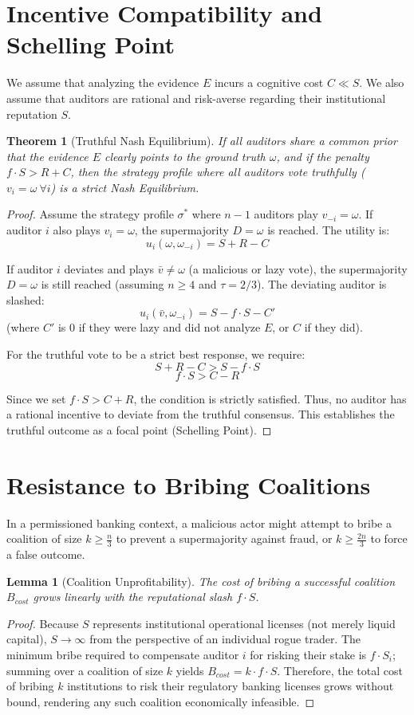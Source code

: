 \documentclass[11pt,a4paper]{article}
\newtheorem{theorem}{Theorem}
\newtheorem{lemma}{Lemma}
\begin{document}
\section{Incentive Compatibility and Schelling Point}
We assume that analyzing the evidence $E$ incurs a cognitive cost $C \ll S$. We also assume that auditors are rational and risk-averse regarding their institutional reputation $S$.

\begin{theorem}[Truthful Nash Equilibrium]
If all auditors share a common prior that the evidence $E$ clearly points to the ground truth $\omega$, and if the penalty $f \cdot S > R + C$, then the strategy profile where all auditors vote truthfully ($v_i = \omega \ \forall i$) is a strict Nash Equilibrium.
\end{theorem}
\begin{proof}
Assume the strategy profile $\sigma^*$ where $n-1$ auditors play $v_{-i} = \omega$.
If auditor $i$ also plays $v_i = \omega$, the supermajority $D = \omega$ is reached.
The utility is:
\[ u_i(\omega, \omega_{-i}) = S + R - C \]

If auditor $i$ deviates and plays $\bar{v} \neq \omega$ (a malicious or lazy vote), the supermajority $D = \omega$ is still reached (assuming $n \geq 4$ and $\tau = 2/3$). The deviating auditor is slashed:
\[ u_i(\bar{v}, \omega_{-i}) = S - f \cdot S - C' \]
(where $C'$ is $0$ if they were lazy and did not analyze $E$, or $C$ if they did).

For the truthful vote to be a strict best response, we require:
\[ S + R - C > S - f \cdot S \]
\[ f \cdot S > C - R \]

Since we set $f \cdot S > C + R$, the condition is strictly satisfied. Thus, no auditor has a rational incentive to deviate from the truthful consensus. This establishes the truthful outcome as a focal point (Schelling Point).
\end{proof}

\section{Resistance to Bribing Coalitions}
In a permissioned banking context, a malicious actor might attempt to bribe a coalition of size $k \geq \frac{n}{3}$ to prevent a supermajority against fraud, or $k \geq \frac{2n}{3}$ to force a false outcome.

\begin{lemma}[Coalition Unprofitability]
The cost of bribing a successful coalition $B_{cost}$ grows linearly with the reputational slash $f \cdot S$.
\end{lemma}
\begin{proof}
Because $S$ represents institutional operational licenses (not merely liquid capital), $S \to \infty$ from the perspective of an individual rogue trader. The minimum bribe required to compensate auditor $i$ for risking their stake is $f \cdot S_i$; summing over a coalition of size $k$ yields $B_{cost} = k \cdot f \cdot S$. Therefore, the total cost of bribing $k$ institutions to risk their regulatory banking licenses grows without bound, rendering any such coalition economically infeasible.
\end{proof}
\end{document}
